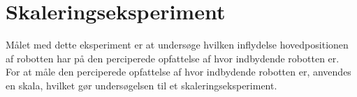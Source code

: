 \chapter*{Skaleringseksperiment}
%
Målet med dette eksperiment er at undersøge hvilken inflydelse hovedpositionen af robotten har på den perciperede opfattelse af hvor indbydende robotten er. 
\\
For at måle den perciperede opfattelse af hvor indbydende robotten er, anvendes en skala, hvilket gør undersøgelsen til et skaleringseksperiment. 
 

